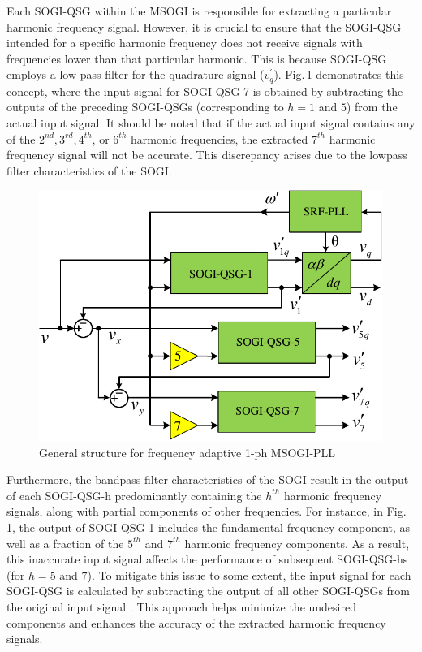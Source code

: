 Each SOGI-QSG within the MSOGI is responsible for extracting a particular harmonic frequency signal. However, it is crucial to ensure that the SOGI-QSG intended for a specific harmonic frequency does not receive signals with frequencies lower than that particular harmonic. This is because SOGI-QSG employs a low-pass filter for the quadrature signal ($v^{\prime}_{q}$). Fig.\,\ref{fig3.5} demonstrates this concept, where the input signal for SOGI-QSG-7 is obtained by subtracting the outputs of the preceding SOGI-QSGs (corresponding to $h = 1$ and $5$) from the actual input signal. It should be noted that if the actual input signal contains any of the $2^{nd}, 3^{rd}, 4^{th}$, or $6^{th}$ harmonic frequencies, the extracted $7^{th}$ harmonic frequency signal will not be accurate. This discrepancy arises due to the lowpass filter characteristics of the SOGI.
\begin{figure}[]   
	\centering
	\includegraphics[scale=0.7]{figures/Chapter_3/Mine/MSOGI-PLL.pdf}
	\caption{General structure for frequency adaptive 1-ph MSOGI-PLL}
	\label{fig3.5}
\end{figure} 

Furthermore, the bandpass filter characteristics of the SOGI result in the output of each SOGI-QSG-h predominantly containing the $h^{th}$ harmonic frequency signals, along with partial components of other frequencies. For instance, in Fig.\,\ref{fig3.5}, the output of SOGI-QSG-1 includes the fundamental frequency component, as well as a fraction of the $5^{th}$ and $7^{th}$ harmonic frequency components. As a result, this inaccurate input signal affects the performance of subsequent SOGI-QSG-hs (for $h = 5$ and $7$). To mitigate this issue to some extent, the input signal for each SOGI-QSG is calculated by subtracting the output of all other SOGI-QSGs from the original input signal \cite{4758048,5446347}. This approach helps minimize the undesired components and enhances the accuracy of the extracted harmonic frequency signals.

